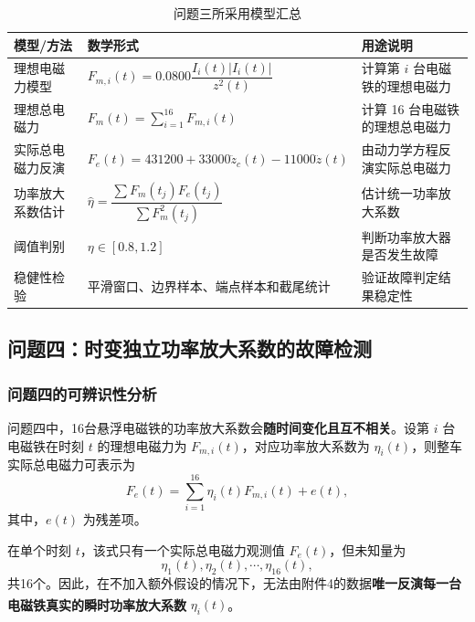 \documentclass[a4paper]{nmmcm}
\newcommand{\upcite}[1]{\textsuperscript{\cite{#1}}}
\begin{document}
\FloatBarrier
\begin{table}[H]
\centering
\caption{问题三所采用模型汇总}
\label{tab:problem3_model_summary}
\begin{tabular}{p{} p{} p{}}
\hline
模型/方法 & 数学形式 & 用途说明 \\
\hline
理想电磁力模型 
& $F_{m,i}(t)=0.0800\dfrac{I_i(t)|I_i(t)|}{z^2(t)}$ 
& 计算第 $i$ 台电磁铁的理想电磁力 \\

理想总电磁力 
& $F_m(t)=\sum_{i=1}^{16}F_{m,i}(t)$ 
& 计算 16 台电磁铁的理想总电磁力 \\

实际总电磁力反演 
& $F_e(t)=431200+33000\ddot{z}_c(t)-11000\ddot{z}(t)$ 
& 由动力学方程反演实际总电磁力 \\

功率放大系数估计 
& $\hat{\eta}=\dfrac{\sum F_m(t_j)F_e(t_j)}{\sum F_m^2(t_j)}$ 
& 估计统一功率放大系数 \\

阈值判别 
& $\eta\in[0.8,1.2]$ 
& 判断功率放大器是否发生故障 \\

稳健性检验 
& 平滑窗口、边界样本、端点样本和截尾统计 
& 验证故障判定结果稳定性 \\
\hline
\end{tabular}
\end{table}
\FloatBarrier

\subsection{问题四：时变独立功率放大系数的故障检测}

\subsubsection{问题四的可辨识性分析}

问题四中，16台悬浮电磁铁的功率放大系数会\textbf{随时间变化且互不相关}。设第 $i$ 台电磁铁在时刻 $t$ 的理想电磁力为 $F_{m,i}(t)$，对应功率放大系数为 $\eta_i(t)$，则整车实际总电磁力可表示为
\begin{equation}
F_e(t)=\sum_{i=1}^{16}\eta_i(t)F_{m,i}(t)+e(t),
\end{equation}
其中，$e(t)$ 为残差项。

在单个时刻 $t$，该式只有一个实际总电磁力观测值 $F_e(t)$，但未知量为
\[
\eta_1(t),\eta_2(t),\cdots,\eta_{16}(t),
\]
共16个。因此，在不加入额外假设的情况下，无法由附件4的数据\textbf{唯一反演每一台电磁铁真实的瞬时功率放大系数} $\eta_i(t)$\upcite{10}。
\end{document}
